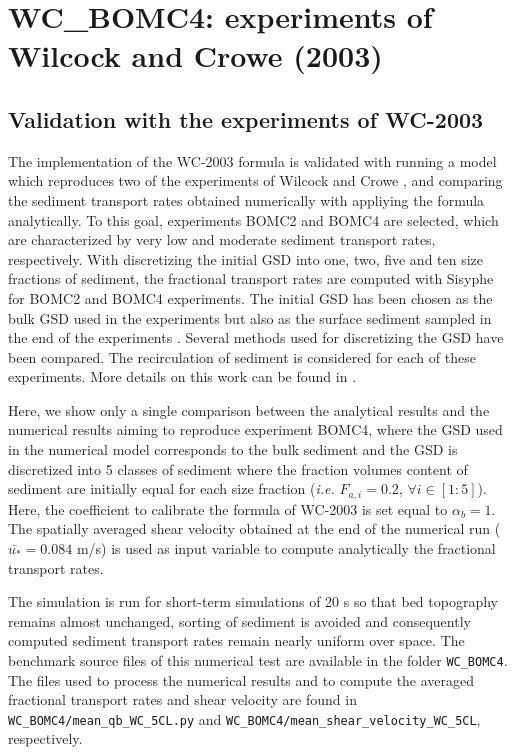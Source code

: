 \chapter{WC\_BOMC4: experiments of Wilcock and Crowe (2003)}
\section{Validation with the experiments of WC-2003}
The implementation of the WC-2003 formula is validated with running a model which reproduces two of the experiments of Wilcock and Crowe \cite{Wilcock2003}, and comparing the sediment transport rates obtained numerically with appliying the formula analytically.
To this goal, experiments BOMC2 and BOMC4 are selected, which are characterized by very low and moderate sediment transport rates, respectively. With discretizing the initial GSD into one, two, five and ten size fractions of sediment, the fractional transport rates are computed with Sisyphe for BOMC2 and BOMC4 experiments. The initial GSD has been chosen as the bulk GSD used in the experiments but also as the surface sediment sampled in the end of the experiments \cite{Wilcock2003,Cordier2016tuc}. Several methods used for discretizing the GSD have been compared. The recirculation of sediment is considered for each of these experiments. More details on this work can be found in \cite{Cordier2016tuc}.

Here, we show only a single comparison between the analytical results and the numerical results aiming to reproduce experiment BOMC4, where the GSD used in the numerical model corresponds to the bulk sediment and the GSD is discretized into 5 classes of sediment where the fraction volumes content of sediment are initially equal for each size fraction ({\it i.e.} $F_{a,i}=0.2$, $\forall i \in [1:5]$). Here, the coefficient to calibrate the formula of WC-2003 is set equal to $\alpha_b=1$. The spatially averaged shear velocity obtained at the end of the numerical run ($\bar{u_*}=0.084$ m/s) is used as input variable to compute analytically the fractional transport rates.

The simulation is run for short-term simulations of 20 s so that bed topography remains almost unchanged, sorting of sediment is avoided and consequently computed sediment transport rates remain nearly uniform over space. The benchmark source files of this numerical test are available in the folder \texttt{WC\_BOMC4}. The files used to process the numerical results and to compute the averaged fractional transport rates and shear velocity are found in \texttt{WC\_BOMC4/mean\_qb\_WC\_5CL.py} and \texttt{WC\_BOMC4/mean\_shear\_velocity\_WC\_5CL}, respectively.

